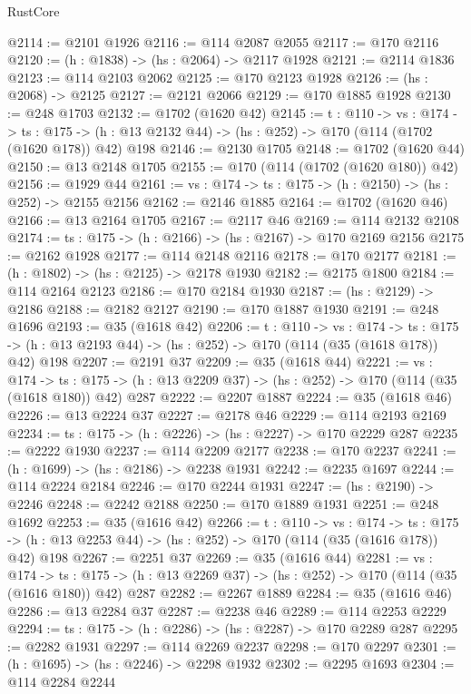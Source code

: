 \begin{lexlean}{RustCore}
\begin{coremodule}
@2114 := @2101 @1926
@2116 := @114 @2087 @2055
@2117 := @170 @2116
@2120 := (h : @1838) -> (hs : @2064) -> @2117 @1928
@2121 := @2114 @1836
@2123 := @114 @2103 @2062
@2125 := @170 @2123 @1928
@2126 := (hs : @2068) -> @2125
@2127 := @2121 @2066
@2129 := @170 @1885 @1928
@2130 := @248 @1703
@2132 := @1702 (@1620 @42)
@2145 := {t : @110} ->
  {vs : @174} ->
  {ts : @175} -> (h : @13 @2132 @44) -> (hs : @252) -> @170 (@114 (@1702 (@1620 @178)) @42) @198
@2146 := @2130 @1705
@2148 := @1702 (@1620 @44)
@2150 := @13 @2148 @1705
@2155 := @170 (@114 (@1702 (@1620 @180)) @42)
@2156 := @1929 @44
@2161 := {vs : @174} -> {ts : @175} -> (h : @2150) -> (hs : @252) -> @2155 @2156
@2162 := @2146 @1885
@2164 := @1702 (@1620 @46)
@2166 := @13 @2164 @1705
@2167 := @2117 @46
@2169 := @114 @2132 @2108
@2174 := {ts : @175} -> (h : @2166) -> (hs : @2167) -> @170 @2169 @2156
@2175 := @2162 @1928
@2177 := @114 @2148 @2116
@2178 := @170 @2177
@2181 := (h : @1802) -> (hs : @2125) -> @2178 @1930
@2182 := @2175 @1800
@2184 := @114 @2164 @2123
@2186 := @170 @2184 @1930
@2187 := (hs : @2129) -> @2186
@2188 := @2182 @2127
@2190 := @170 @1887 @1930
@2191 := @248 @1696
@2193 := @35 (@1618 @42)
@2206 := {t : @110} ->
  {vs : @174} ->
  {ts : @175} -> (h : @13 @2193 @44) -> (hs : @252) -> @170 (@114 (@35 (@1618 @178)) @42) @198
@2207 := @2191 @37
@2209 := @35 (@1618 @44)
@2221 := {vs : @174} ->
  {ts : @175} -> (h : @13 @2209 @37) -> (hs : @252) -> @170 (@114 (@35 (@1618 @180)) @42) @287
@2222 := @2207 @1887
@2224 := @35 (@1618 @46)
@2226 := @13 @2224 @37
@2227 := @2178 @46
@2229 := @114 @2193 @2169
@2234 := {ts : @175} -> (h : @2226) -> (hs : @2227) -> @170 @2229 @287
@2235 := @2222 @1930
@2237 := @114 @2209 @2177
@2238 := @170 @2237
@2241 := (h : @1699) -> (hs : @2186) -> @2238 @1931
@2242 := @2235 @1697
@2244 := @114 @2224 @2184
@2246 := @170 @2244 @1931
@2247 := (hs : @2190) -> @2246
@2248 := @2242 @2188
@2250 := @170 @1889 @1931
@2251 := @248 @1692
@2253 := @35 (@1616 @42)
@2266 := {t : @110} ->
  {vs : @174} ->
  {ts : @175} -> (h : @13 @2253 @44) -> (hs : @252) -> @170 (@114 (@35 (@1616 @178)) @42) @198
@2267 := @2251 @37
@2269 := @35 (@1616 @44)
@2281 := {vs : @174} ->
  {ts : @175} -> (h : @13 @2269 @37) -> (hs : @252) -> @170 (@114 (@35 (@1616 @180)) @42) @287
@2282 := @2267 @1889
@2284 := @35 (@1616 @46)
@2286 := @13 @2284 @37
@2287 := @2238 @46
@2289 := @114 @2253 @2229
@2294 := {ts : @175} -> (h : @2286) -> (hs : @2287) -> @170 @2289 @287
@2295 := @2282 @1931
@2297 := @114 @2269 @2237
@2298 := @170 @2297
@2301 := (h : @1695) -> (hs : @2246) -> @2298 @1932
@2302 := @2295 @1693
@2304 := @114 @2284 @2244

\end{coremodule}
\end{lexlean}
